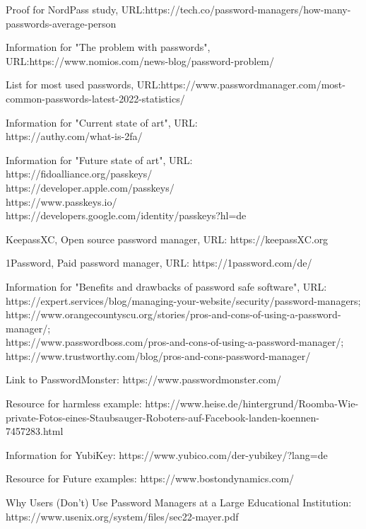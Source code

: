 \documentclass[conference]{IEEEtran}
\begin{document}
\begin{thebibliography}{00}
 Proof for NordPass study, URL:https://tech.co/password-managers/how-many-passwords-average-person


 Information for "The problem with passwords", URL:https://www.nomios.com/news-blog/password-problem/ 

 List for most used passwords, URL:https://www.passwordmanager.com/most-common-passwords-latest-2022-statistics/

 Information for "Current state of art", URL:\\ https://authy.com/what-is-2fa/

 Information for "Future state of art", URL:\\https://fidoalliance.org/passkeys/\\ https://developer.apple.com/passkeys/\\ https://www.passkeys.io/\\ https://developers.google.com/identity/passkeys?hl=de

 KeepassXC, Open source password manager, URL: https://keepassXC.org

 1Password, Paid password manager, URL: https://1password.com/de/

 Information for "Benefits and drawbacks of password safe software", URL: \\
https://expert.services/blog/managing-your-website/security/password-managers;\\ https://www.orangecountyscu.org/stories/pros-and-cons-of-using-a-password-manager/; \\ https://www.passwordboss.com/pros-and-cons-of-using-a-password-manager/; \\https://www.trustworthy.com/blog/pros-and-cons-password-manager/

 Link to PasswordMonster: https://www.passwordmonster.com/

 Resource for harmless example: https://www.heise.de/hintergrund/Roomba-Wie-private-Fotos-eines-Staubsauger-Roboters-auf-Facebook-landen-koennen-7457283.html

 Information for YubiKey: https://www.yubico.com/der-yubikey/?lang=de

 Resource for Future examples: https://www.bostondynamics.com/

 Why Users (Don’t) Use Password Managers at a Large Educational Institution: https://www.usenix.org/system/files/sec22-mayer.pdf


\end{thebibliography}
\end{document}
